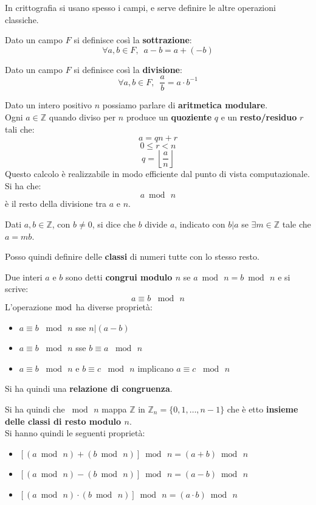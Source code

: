 \documentclass[a4paper,12pt, oneside]{book}
\begin{document}
In crittografia si usano spesso i campi, e serve definire le altre operazioni
classiche.
\begin{definizione}
  Dato un campo $F$ si definisce così la \textbf{sottrazione}:
  \[\forall a,b\in F,\,\,\, a-b=a+(-b)\]
\end{definizione}
\begin{definizione}
  Dato un campo $F$ si definisce così la \textbf{divisione}:
  \[\forall a,b\in F,\,\,\, \frac{a}{b}=a\cdot b^{-1}\]
\end{definizione}
\begin{definizione}
  Dato un intero positivo $n$ possiamo parlare di \textbf{aritmetica
    modulare}. \\
  Ogni $a\in\mathbb{Z}$ quando diviso per $n$ produce un \textbf{quoziente}
  $q$ e un \textbf{resto/residuo} $r$ tali che:
  \[a = qn + r\]
  \[0\leq r<n\]
  \[q=\left\lfloor\frac{a}{n}\right\rfloor\]
  Questo calcolo è realizzabile in modo efficiente dal punto di vista
  computazionale.\\
  Si ha che:
  \[a\bmod \,n\]
  è il resto della divisione tra $a$ e $n$.
\end{definizione}
\begin{definizione}
  Dati $a,b\in\mathbb{Z}$, con $b\neq 0$, si dice che $b$ divide $a$, indicato
  con  $b|a$ se $\exists m\in \mathbb{Z}$ tale che $a=mb$.
\end{definizione}
Posso quindi definire delle \textbf{classi} di numeri tutte con lo stesso
resto.
\begin{definizione}
  Due interi $a$ e $b$ sono detti \textbf{congrui modulo $n$} se $a\bmod\,
  n=b\bmod\, n$ e si scrive:
  \[a\equiv b\,\,\bmod\,n\]
  L'operazione $\bmod$ ha diverse proprietà:
  \begin{itemize}
    \item $a\equiv b\,\,\bmod\,n$ sse $n|(a-b)$
    \item $a\equiv b\,\,\bmod\,n$ sse $b\equiv a\,\,\bmod\,n$
    \item $a\equiv b\,\,\bmod\,n$ e $b\equiv c\,\,\bmod\,n$ implicano $a\equiv
    c\,\,\bmod\,n$ 
  \end{itemize}
  Si ha quindi una \textbf{relazione di congruenza}.
\end{definizione}
Si ha quindi che $\bmod \,n$ mappa $\mathbb{Z}$ in
$\mathbb{Z}_n=\{0,1,\ldots,n-1\}$ che è etto \textbf{insieme delle classi di
  resto modulo $n$}.\\
Si hanno quindi le seguenti proprietà:
\begin{itemize}
  \item $[(a \bmod\,n)+ (b\bmod\,n)]\bmod\,n = (a + b)\bmod\, n$
  \item $[(a \bmod\,n)- (b\bmod\,n)]\bmod\,n = (a - b)\bmod\, n$
  \item $[(a \bmod\,n)\cdot (b\bmod\,n)]\bmod\,n = (a \cdot b)\bmod\, n$
\end{itemize}
\end{document}
